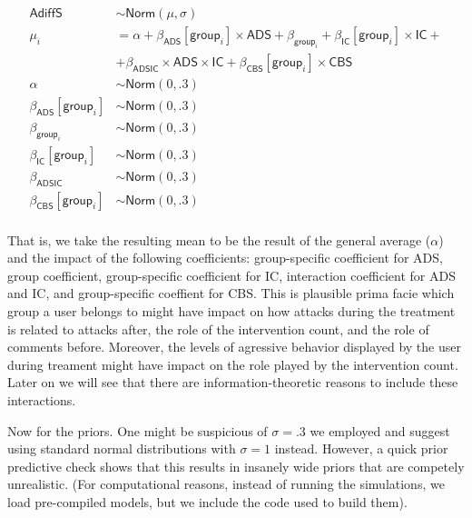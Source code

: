 \documentclass[10pt,dvipsnames,enabledeprecatedfontcommands]{scrartcl}
\begin{document}
\begin{align*}
\mathsf{AdiffS} & \sim \textsf{Norm}(\mu, \sigma)\\
\mu_i & = \alpha + \beta_{\mathsf{ADS}}[\mathsf{group}_i]\times \mathsf{ADS} + \beta_{\mathsf{group}_i}  +
 \beta_{\mathsf{IC}}[\mathsf{group}_i]\times \mathsf{IC} + \\
 & + \beta_{\mathsf{ADSIC}}\times \mathsf{ADS} \times \mathsf{IC} + \beta_{\mathsf{CBS}}[\mathsf{group}_i] \times \mathsf{CBS}\\
 \alpha & \sim \textsf{Norm}(0,.3)\\
\beta_{\mathsf{ADS}}[\mathsf{group}_i] & \sim \textsf{Norm}(0,.3)\\
\beta_{\mathsf{group}_i} & \sim \textsf{Norm}(0,.3)\\
\beta_{\mathsf{IC}}[\mathsf{group}_i] & \sim \textsf{Norm}(0,.3)\\
 \beta_{\mathsf{ADSIC}} & \sim \textsf{Norm}(0,.3)\\
 \beta_{\mathsf{CBS}}[\mathsf{group}_i]& \sim \textsf{Norm}(0,.3)\\
\end{align*}

That is, we take the resulting mean to be the result of the general
average (\(\alpha\)) and the impact of the following coefficients:
group-specific coefficient for \textsf{ADS}, group coefficient,
group-specific coefficient for \textsf{IC}, interaction coefficient for
\textsf{ADS} and \textsf{IC}, and group-specific coeffient for
\textsf{CBS}. This is plausible prima facie which group a user belongs
to might have impact on how attacks during the treatment is related to
attacks after, the role of the intervention count, and the role of
comments before. Moreover, the levels of agressive behavior displayed by
the user during treament might have impact on the role played by the
intervention count. Later on we will see that there are
information-theoretic reasons to include these interactions.

Now for the priors. One might be suspicious of \(\sigma =.3\) we
employed and suggest using standard normal distributions with
\(\sigma = 1\) instead. However, a quick prior predictive check shows
that this results in insanely wide priors that are competely
unrealistic. (For computational reasons, instead of running the
simulations, we load pre-compiled models, but we include the code used
to build them).

\vspace{1mm} \footnotesize
\end{document}
